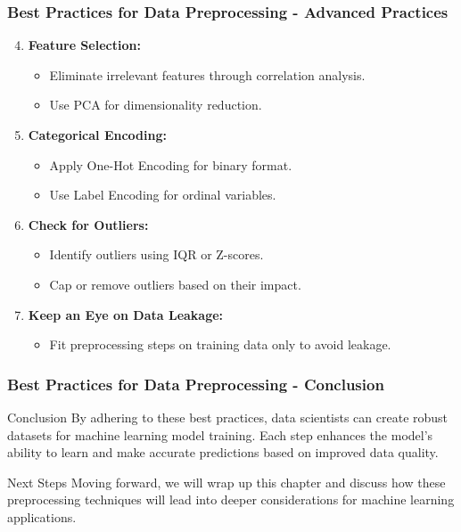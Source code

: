 \documentclass[aspectratio=169]{beamer}
\begin{document}
\begin{frame}[fragile]
    \frametitle{Best Practices for Data Preprocessing - Advanced Practices}
    \begin{enumerate}
        \setcounter{enumi}{3}
        \item \textbf{Feature Selection:}
        \begin{itemize}
            \item Eliminate irrelevant features through correlation analysis.
            \item Use PCA for dimensionality reduction.
        \end{itemize}
        
        \item \textbf{Categorical Encoding:}
        \begin{itemize}
            \item Apply One-Hot Encoding for binary format.
            \item Use Label Encoding for ordinal variables.
        \end{itemize}

        \item \textbf{Check for Outliers:}
        \begin{itemize}
            \item Identify outliers using IQR or Z-scores.
            \item Cap or remove outliers based on their impact.
        \end{itemize}

        \item \textbf{Keep an Eye on Data Leakage:}
        \begin{itemize}
            \item Fit preprocessing steps on training data only to avoid leakage.
        \end{itemize}
    \end{enumerate}
\end{frame}

\begin{frame}[fragile]
    \frametitle{Best Practices for Data Preprocessing - Conclusion}
    \begin{block}{Conclusion}
        By adhering to these best practices, data scientists can create robust datasets for machine learning model training. 
        Each step enhances the model's ability to learn and make accurate predictions based on improved data quality.
    \end{block}

    \begin{block}{Next Steps}
        Moving forward, we will wrap up this chapter and discuss how these preprocessing techniques will lead into deeper considerations for machine learning applications.
    \end{block}
\end{frame}
\end{document}
